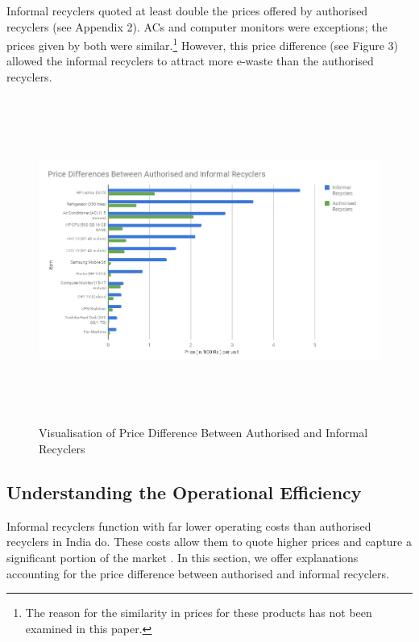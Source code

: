 \documentclass[a4paper, 12pt]{article}
\begin{document}
                     Informal recyclers quoted at least double the prices offered by authorised recyclers (see Appendix 2). ACs and computer monitors were exceptions; the prices given by both were similar.\footnote{The reason for the similarity in prices for these products has not been examined in this paper.} However, this price difference (see Figure 3) allowed the informal recyclers to attract more e-waste than the authorised recyclers. \\
                                        
                    \begin{figure}[H]
                    \flushleft
                    \includegraphics[height= 4.20in]{fig3.png}
                    \caption[Optional Caption]{Visualisation of Price Difference Between Authorised and Informal Recyclers}
                    \end{figure}
                    
                    \subsection{Understanding the Operational Efficiency}
                    
                    Informal recyclers function with far lower operating costs than authorised recyclers in India do. These costs allow them to quote higher prices and capture a significant portion of the market \parencite{chintanreport}. In this section, we offer explanations accounting for the price difference between authorised and informal recyclers. 
                    
\end{document}
